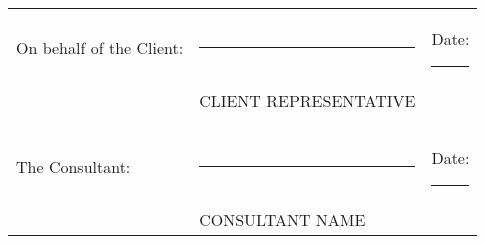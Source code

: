 \documentclass[10pt]{article}
\begin{document}
\noindent \begin{tabular}{l l l}
On behalf of the Client: & \rule{6cm}{.2pt} & Date: \rule{2.4cm}{.2pt}\\
                         & CLIENT REPRESENTATIVE      & \\\\\\
The Consultant:          & \rule{6cm}{.2pt} & Date: \rule{2.4cm}{.2pt}\\
                         & CONSULTANT NAME      & \\
\end{tabular}
\end{document}
